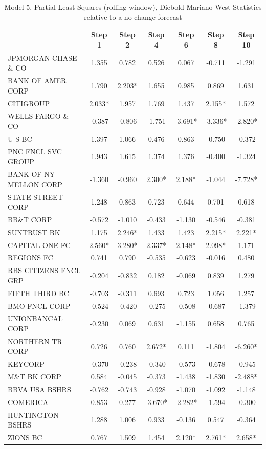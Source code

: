 \documentclass[11pt]{article}
\begin{document}
\begin{table} 
\caption{Model 5, Partial Least Squares (rolling window), Diebold-Mariano-West Statistics relative to a no-change forecast}                                                                  
\center                                                              
\begin{tabular}{|l|c|c|c|c|c|c|}                                     
\hline                                                               
&Step 1 &Step 2 &Step 4 &Step 6 &Step 8 &Step 10\\                   
\hline                                                               
JPMORGAN CHASE \& CO  &1.355&0.782&0.526&0.067&-0.711&-1.291\\       
BANK OF AMER CORP     &1.790&2.203*&1.655&0.985&0.869&1.631\\        
CITIGROUP             &2.033*&1.957&1.769&1.437&2.155*&1.572\\       
WELLS FARGO \& CO     &-0.387&-0.806&-1.751&-3.691*&-3.336*&-2.820*\\
U S BC                &1.397&1.066&0.476&0.863&-0.750&-0.372\\       
PNC FNCL SVC GROUP    &1.943&1.615&1.374&1.376&-0.400&-1.324\\       
BANK OF NY MELLON CORP&-1.360&-0.960&2.300*&2.188*&-1.044&-7.728*\\  
STATE STREET CORP     &1.248&0.863&0.723&0.644&0.701&0.618\\         
BB\&T CORP            &-0.572&-1.010&-0.433&-1.130&-0.546&-0.381\\   
SUNTRUST BK           &1.175&2.246*&1.433&1.423&2.215*&2.221*\\      
CAPITAL ONE FC        &2.560*&3.280*&2.337*&2.148*&2.098*&1.171\\    
REGIONS FC            &0.741&0.790&-0.535&-0.623&-0.016&0.480\\      
RBS CITIZENS FNCL GRP &-0.204&-0.832&0.182&-0.069&0.839&1.279\\      
FIFTH THIRD BC        &-0.703&-0.311&0.693&0.723&1.056&1.257\\       
BMO FNCL CORP         &-0.524&-0.420&-0.275&-0.508&-0.687&-1.379\\   
UNIONBANCAL CORP      &-0.230&0.069&0.631&-1.155&0.658&0.765\\       
NORTHERN TR CORP      &0.726&0.760&2.672*&0.111&-1.804&-6.260*\\     
KEYCORP               &-0.370&-0.238&-0.340&-0.573&-0.678&-0.945\\   
M\&T BK CORP          &0.584&-0.045&-0.373&-1.438&-1.830&-2.488*\\   
BBVA USA BSHRS        &-0.762&-0.743&-0.928&-1.070&-1.092&-1.148\\   
COMERICA              &0.853&0.277&-3.670*&-2.282*&-1.594&-0.300\\   
HUNTINGTON BSHRS      &1.288&1.006&0.933&-0.136&0.547&-0.364\\       
ZIONS BC              &0.767&1.509&1.454&2.120*&2.761*&2.658*\\      
\hline                                                               
\end{tabular}   


\end{table}
\end{document}
